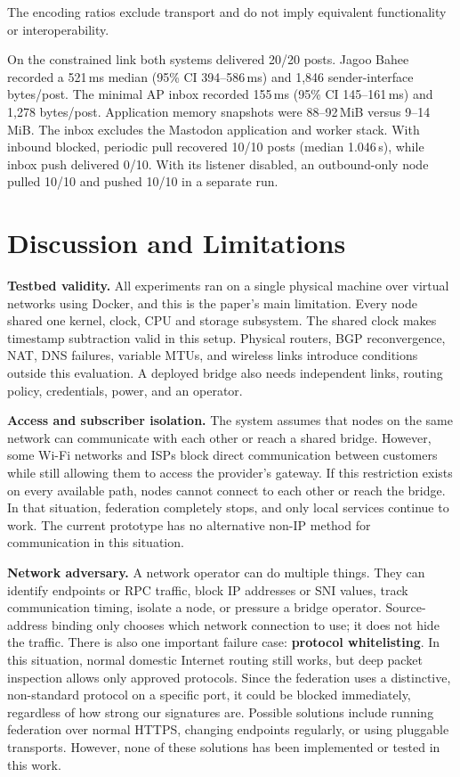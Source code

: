 \documentclass[conference,a4paper,10pt]{IEEEtran}
\begin{document}
The encoding ratios exclude transport and do not imply equivalent functionality or interoperability.

On the constrained link both systems delivered 20/20 posts. Jagoo Bahee recorded a 521\,ms median (95\% CI 394--586\,ms) and 1{,}846 sender-interface bytes/post. The minimal AP inbox recorded 155\,ms (95\% CI 145--161\,ms) and 1{,}278 bytes/post. Application memory snapshots were 88--92\,MiB versus 9--14\,MiB. The inbox excludes the Mastodon application and worker stack. With inbound blocked, periodic pull recovered 10/10 posts (median 1.046\,s), while inbox push delivered 0/10. With its listener disabled, an outbound-only node pulled 10/10 and pushed 10/10 in a separate run.

\section{Discussion and Limitations}
\label{sec:limits}

\textbf{Testbed validity.} All experiments ran on a single physical machine over virtual networks using Docker, and this is the paper's main limitation. Every node shared one kernel, clock, CPU and storage subsystem. The shared clock makes timestamp subtraction valid in this setup. Physical routers, BGP reconvergence, NAT, DNS failures, variable MTUs, and wireless links introduce conditions outside this evaluation. A deployed bridge also needs independent links, routing policy, credentials, power, and an operator.

\textbf{Access and subscriber isolation.} The system assumes that nodes on the same network can communicate with each other or reach a shared bridge. However, some Wi-Fi networks and ISPs block direct communication between customers while still allowing them to access the provider's gateway. If this restriction exists on every available path, nodes cannot connect to each other or reach the bridge. In that situation, federation completely stops, and only local services continue to work. The current prototype has no alternative non-IP method for communication in this situation.

\textbf{Network adversary.} A network operator can do multiple things. They can identify endpoints or RPC traffic, block IP addresses or SNI values, track communication timing, isolate a node, or pressure a bridge operator. Source-address binding only chooses which network connection to use; it does not hide the traffic. There is also one important failure case: \textbf{protocol whitelisting}. In this situation, normal domestic Internet routing still works, but deep packet inspection allows only approved protocols. Since the federation uses a distinctive, non-standard protocol on a specific port, it could be blocked immediately, regardless of how strong our signatures are. Possible solutions include running federation over normal HTTPS, changing endpoints regularly, or using pluggable transports. However, none of these solutions has been implemented or tested in this work.
\end{document}
